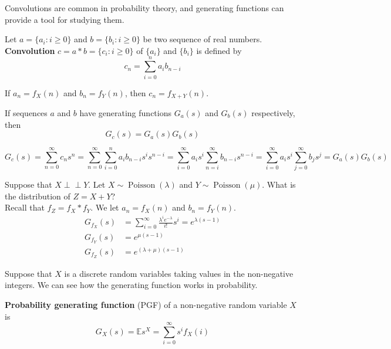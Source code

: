 \documentclass{huhtakm-template-book}
\newcommand{\independent}{\perp\!\!\!\perp}
\newcommand{\expect}{\mathbb{E}}
\DeclareMathOperator{\Poisson}{Poisson}
\begin{document}
\newpage
Convolutions are common in probability theory, and generating functions can provide a tool for studying them.
\begin{defn}
	Let $a=\{a_{i}:i\geq 0\}$ and $b=\{b_{i}:i\geq 0\}$ be two sequence of real numbers. \textbf{Convolution} $c=a*b=\{c_{i}:i\geq 0\}$ of $\{a_{i}\}$ and $\{b_{i}\}$ is defined by
	\begin{equation*}
		c_{n}=\sum_{i=0}^{n}a_{i}b_{n-i}
	\end{equation*}
\end{defn}
\begin{eg}
	If $a_{n}=f_{X}(n)$ and $b_{n}=f_{Y}(n)$, then $c_{n}=f_{X+Y}(n)$.
\end{eg}
\begin{cla}
	If sequences $a$ and $b$ have generating functions $G_{a}(s)$ and $G_{b}(s)$ respectively, then
	\begin{equation*}
		G_{c}(s)=G_{a}(s)G_{b}(s)
	\end{equation*}
\end{cla}
\begin{proofing}
	\begin{equation*}
		G_{c}(s)=\sum_{n=0}^{\infty}c_{n}s^{n}=\sum_{n=0}^{\infty}\sum_{i=0}^{n}a_{i}b_{n-i}s^{i}s^{n-i}=\sum_{i=0}^{\infty}a_{i}s^{i}\sum_{n=i}^{\infty}b_{n-i}s^{n-i}=\sum_{i=0}^{\infty}a_{i}s^{i}\sum_{j=0}^{\infty}b_{j}s^{j}=G_{a}(s)G_{b}(s)
	\end{equation*}
\end{proofing}
\begin{eg}
	\label{Two independent poisson PGF}
	Suppose that $X\independent Y$. Let $X\sim\Poisson(\lambda)$ and $Y\sim\Poisson(\mu)$. What is the distribution of $Z=X+Y$?\\
	Recall that $f_{Z}=f_{X}*f_{Y}$. We let $a_{n}=f_{X}(n)$ and $b_{n}=f_{Y}(n)$.
	\begin{align*}
		G_{f_{X}}(s)&=\sum_{i=0}^{\infty}\frac{\lambda^{i}e^{-\lambda}}{i!}s^{i}=e^{\lambda(s-1)}\\
		G_{f_{Y}}(s)&=e^{\mu(s-1)}\\
		G_{f_{Z}}(s)&=e^{(\lambda+\mu)(s-1)}
	\end{align*}
\end{eg}
Suppose that $X$ is a discrete random variables taking values in the non-negative integers. We can see how the generating function works in probability.
\begin{defn}
	\textbf{Probability generating function} (PGF) of a non-negative random variable $X$ is
	\begin{equation*}
		G_{X}(s)=\expect s^{X}=\sum_{i=0}^{\infty}s^{i}f_{X}(i)
	\end{equation*}
\end{defn}
\end{document}
